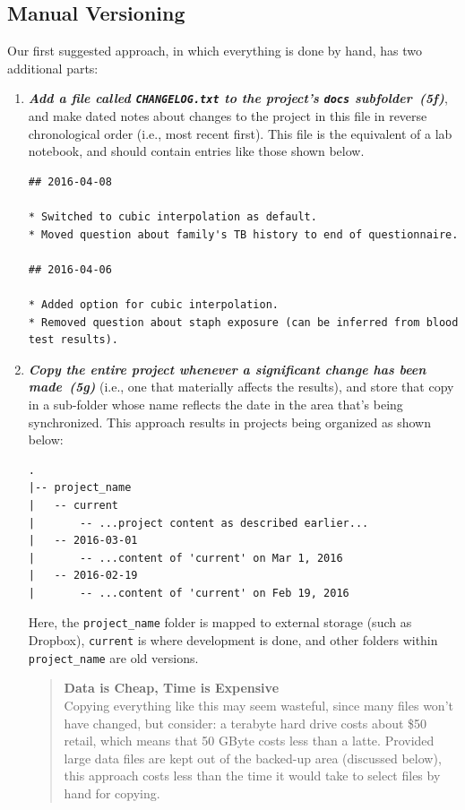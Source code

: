 \documentclass[10pt,letterpaper]{article}
\newcommand{\practice}[2]{\textbf{\emph{{#2}~({#1})}}}
\begin{document}
\subsection*{Manual Versioning}

Our first suggested approach, in which everything is done by hand, has
two additional parts:

\begin{enumerate}

\item
  \practice{5f}{Add a file called \texttt{CHANGELOG.txt} to the project's
    \texttt{docs} subfolder}, and make dated notes about changes to
  the project in this file in reverse chronological order (i.e., most
  recent first). This file is the equivalent of a lab notebook, and
  should contain entries like those shown below.

{\small
\begin{verbatim}
## 2016-04-08

* Switched to cubic interpolation as default.
* Moved question about family's TB history to end of questionnaire.

## 2016-04-06

* Added option for cubic interpolation.
* Removed question about staph exposure (can be inferred from blood test results).
\end{verbatim}
}

\item
  \practice{5g}{Copy the entire project whenever a significant change has
    been made} (i.e., one that materially affects the results), and store that
    copy in a sub-folder whose name reflects
  the date in the area that's being synchronized. This approach
  results in projects being organized as shown below:

{\small
\begin{verbatim}
.
|-- project_name
|   -- current
|       -- ...project content as described earlier...
|   -- 2016-03-01
|       -- ...content of 'current' on Mar 1, 2016
|   -- 2016-02-19
|       -- ...content of 'current' on Feb 19, 2016
\end{verbatim}
}

  Here, the \texttt{project\_name} folder is
  mapped to external storage (such as Dropbox), \texttt{current} is
  where development is done, and other folders within
  \texttt{project\_name} are old versions.

  \begin{quote}
    \noindent \textbf{Data is Cheap, Time is Expensive}
    \\
    Copying everything like this may seem wasteful, since many files
    won't have changed, but consider: a terabyte hard drive costs
    about \$50 retail, which means that 50 GByte costs less than a
    latte. Provided large data files are kept out of the backed-up
    area (discussed below), this approach costs less than the time it
    would take to select files by hand for copying.
  \end{quote}

\end{enumerate}
\end{document}
